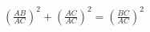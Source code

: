 \documentclass[preview]{standalone}
\begin{document}
\begin{align*}
\left(\frac{AB}{AC}\right)^2 + \left(\frac{AC}{AC}\right)^2 = \left(\frac{BC}{AC}\right)^2
\end{align*}
\end{document}
